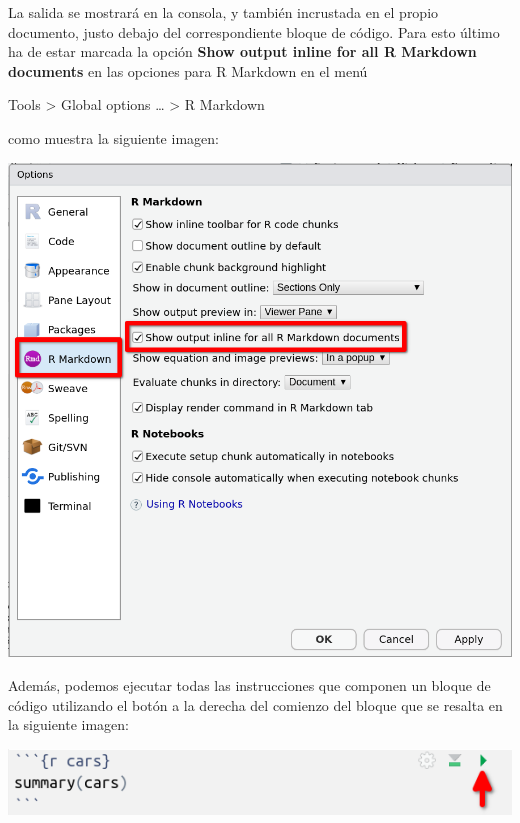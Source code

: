 \documentclass[
  degree=mecinf,
  title=normal,
  toc=normal,
  bib=normal]{mnye}
\begin{document}
La salida se mostrará en la consola, y también incrustada en el propio documento, justo debajo del correspondiente bloque de código. Para esto último ha de estar marcada la opción \textbf{Show output inline for all R Markdown documents} en las opciones para R Markdown en el menú

\begin{menu}
Tools \textgreater{} Global options \ldots{} \textgreater{} R Markdown

\end{menu}

como muestra la siguiente imagen:

\begin{center}\includegraphics[width=1\linewidth]{images/options-r-markdown-b} \end{center}

Además, podemos ejecutar todas las instrucciones que componen un bloque de código utilizando el botón a la derecha del comienzo del bloque que se resalta en la siguiente imagen:

\begin{center}\includegraphics[width=0.8\linewidth]{images/run} \end{center}
\end{document}
